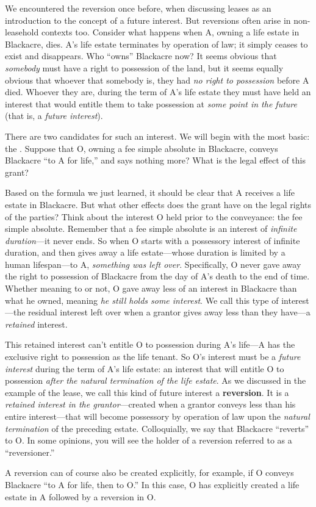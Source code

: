 We encountered the reversion once before, when discussing leases as an
introduction to the concept of a future interest. But reversions often arise in
non-leasehold contexts too. Consider what happens when A, owning a life estate
in Blackacre, dies. A's life estate terminates by operation of law; it simply
ceases to exist and disappears. Who ``owns'' Blackacre now? It seems obvious
that \textit{somebody} must have a right to possession of the land, but it
seems equally obvious that whoever that somebody is, they had \textit{no right
to possession} before A died. Whoever they are, during the term of A's life
estate they must have held an interest that would entitle them to take
possession at \textit{some point in the future} (that is, a \textit{future
interest}).

There are two candidates for such an interest. We will begin with the most
basic: the . Suppose that O, owning a fee simple absolute in
Blackacre, conveys Blackacre ``to A for life,'' and says nothing more? What is
the legal effect of this grant?

Based on the formula we just learned, it should be clear that A receives a life
estate in Blackacre. But what other effects does the grant have on the legal
rights of the parties? Think about the interest O held prior to the conveyance:
the fee simple absolute. Remember that a fee simple absolute is an interest of
\textit{infinite duration}---it never ends. So when O starts with a
possessory interest of infinite duration, and then gives away a life
estate---whose duration is limited by a human lifespan---to A,
\textit{something was left over}. Specifically, O never gave away the right to
possession of Blackacre from the day of A's death to the end of time. Whether
meaning to or not, O gave away less of an interest in Blackacre than what he
owned, meaning \textit{he still holds some interest}. We call this type of
interest---the residual interest left over when a grantor gives away less than
they have---a \textit{retained} interest.

This retained interest can't entitle O to possession during A's life---A has the
exclusive right to possession as the life tenant. So O's interest must be a
\textit{future interest} during the term of A's life estate: an interest that
will entitle O to possession \textit{after the natural termination of the life
estate}. As we discussed in the example of the lease, we call this kind of
future interest a \textbf{reversion}. It is a \textit{retained interest in the
grantor}---created when a grantor conveys less than his entire
interest---that will become possessory by operation of law upon the
\textit{natural termination} of the preceding estate. Colloquially, we say that
Blackacre ``reverts'' to O. In some opinions, you will see the holder of a
reversion referred to as a ``reversioner.''

A reversion can of course also be created explicitly, for example, if O conveys
Blackacre ``to A for life, then to O.'' In this case, O has explicitly created
a life estate in A followed by a reversion in O.

